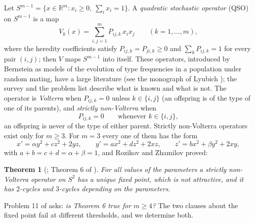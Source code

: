\documentclass[11pt]{amsart}
\newtheorem{theorem}{Theorem}[section]
\theoremstyle{definition}
\newcommand{\R}{\mathbb{R}}
\newcommand{\Simp}{S^{m-1}}
\begin{document}
Let $\Simp=\{x\in\R^m: x_i\ge0,\ \sum_ix_i=1\}$. A \emph{quadratic stochastic operator} (QSO) on $\Simp$ is a map
\begin{equation}\label{eq:qso}
V_k(x)=\sum_{i,j=1}^m P_{ij,k}\,x_ix_j\qquad(k=1,\dots,m),
\end{equation}
where the heredity coefficients satisfy $P_{ij,k}=P_{ji,k}\ge0$ and $\sum_kP_{ij,k}=1$ for every pair $(i,j)$; then $V$ maps $\Simp$ into itself. These operators, introduced by Bernstein \cite{Ber42} as models of the evolution of type frequencies in a population under random mating, have a large literature (see the monograph of Lyubich \cite{Lyu92}); the survey \cite{GMR11} and the problem list \cite{GR09} describe what is known and what is not. The operator is \emph{Volterra} when $P_{ij,k}=0$ unless $k\in\{i,j\}$ (an offspring is of the type of one of its parents), and \emph{strictly non-Volterra} when
\begin{equation}\label{eq:snv}
P_{ij,k}=0\qquad\text{whenever }k\in\{i,j\},
\end{equation}
an offspring is never of the type of either parent. Strictly non-Volterra operators exist only for $m\ge3$. For $m=3$ every one of them has the form
\[
x'=\alpha y^2+cz^2+2yz,\qquad y'=ax^2+dz^2+2xz,\qquad z'=bx^2+\beta y^2+2xy,
\]
with $a+b=c+d=\alpha+\beta=1$, and Rozikov and Zhamilov \cite{RZ09} proved:

\begin{theorem}[{\cite{RZ09}; Theorem 6 of \cite{GR09}}]\label{thm:six}
For all values of the parameters a strictly non-Volterra operator on $S^2$ has a unique fixed point, which is not attractive, and it has $2$-cycles and $3$-cycles depending on the parameters.
\end{theorem}

Problem 11 of \cite{GR09} asks: \emph{is Theorem 6 true for $m\ge4$?} The two clauses about the fixed point fail at different thresholds, and we determine both.
\end{document}

